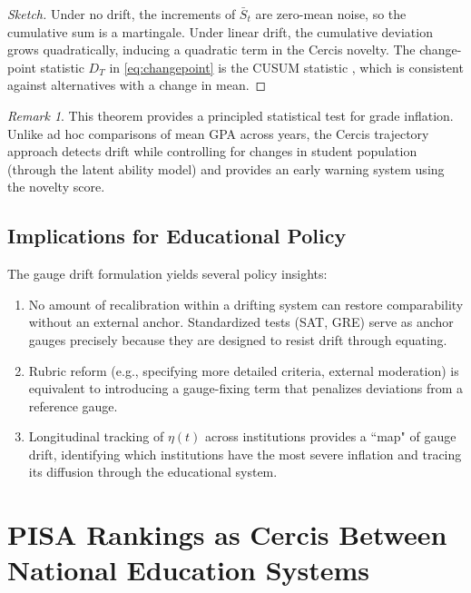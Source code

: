 \documentclass[12pt,a4paper]{article}
\theoremstyle{remark}
\newtheorem{remark}[theorem]{Remark}
\begin{document}
\begin{proof}[Sketch]
Under no drift, the increments of $\bar{S}_t$ are zero-mean noise, so the cumulative sum is a martingale. Under linear drift, the cumulative deviation grows quadratically, inducing a quadratic term in the Cercis novelty. The change-point statistic $D_T$ in \eqref{eq:changepoint} is the CUSUM statistic \cite{page1954}, which is consistent against alternatives with a change in mean.
\end{proof}

\begin{remark}
This theorem provides a principled statistical test for grade inflation. Unlike ad hoc comparisons of mean GPA across years, the Cercis trajectory approach detects drift while controlling for changes in student population (through the latent ability model) and provides an early warning system using the novelty score.
\end{remark}

\subsection{Implications for Educational Policy}

The gauge drift formulation yields several policy insights:

\begin{enumerate}
    \item No amount of recalibration within a drifting system can restore comparability without an external anchor. Standardized tests (SAT, GRE) serve as anchor gauges precisely because they are designed to resist drift through equating.

    \item Rubric reform (e.g., specifying more detailed criteria, external moderation) is equivalent to introducing a gauge-fixing term that penalizes deviations from a reference gauge.

    \item Longitudinal tracking of $\eta(t)$ across institutions provides a ``map" of gauge drift, identifying which institutions have the most severe inflation and tracing its diffusion through the educational system.
\end{enumerate}

\section{PISA Rankings as Cercis Between National Education Systems}
\end{document}
